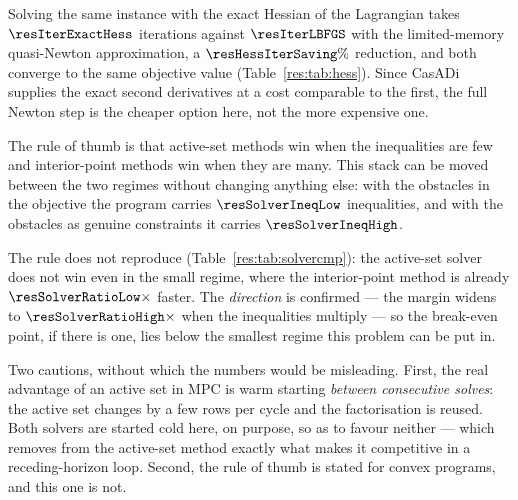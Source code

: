\label{res:hess}


Solving the same instance with the exact Hessian of the Lagrangian takes $\resIterExactHess$ iterations against $\resIterLBFGS$ with the limited-memory quasi-Newton approximation, a $\resHessIterSaving\%$ reduction, and both converge to the same objective value (Table~\ref{res:tab:hess}). Since CasADi supplies the exact second derivatives at a cost comparable to the first, the full Newton step is the cheaper option here, not the more expensive one.

\begin{table}[htbp]
  \centering
  \small
  \caption{Interior-point iterations with the exact Hessian and with the limited-memory quasi-Newton approximation, on the same instance. Bold: the lower iteration count.}
  \label{res:tab:hess}
\end{table}

\label{res:solvercmp}


The rule of thumb is that active-set methods win when the inequalities are few and interior-point methods win when they are many. This stack can be moved between the two regimes without changing anything else: with the obstacles in the objective the program carries $\resSolverIneqLow$ inequalities, and with the obstacles as genuine constraints it carries $\resSolverIneqHigh$.

The rule does not reproduce (Table~\ref{res:tab:solvercmp}): the active-set solver does not win even in the small regime, where the interior-point method is already $\resSolverRatioLow\times$ faster. The \emph{direction} is confirmed --- the margin widens to $\resSolverRatioHigh\times$ when the inequalities multiply --- so the break-even point, if there is one, lies below the smallest regime this problem can be put in.

Two cautions, without which the numbers would be misleading. First, the real advantage of an active set in MPC is warm starting \emph{between consecutive solves}: the active set changes by a few rows per cycle and the factorisation is reused. Both solvers are started cold here, on purpose, so as to favour neither --- which removes from the active-set method exactly what makes it competitive in a receding-horizon loop. Second, the rule of thumb is stated for convex programs, and this one is not.

